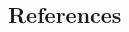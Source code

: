 \documentclass[12pt,english]{article}
\begin{document}
\begin{spacing}{1.9}
 
%
%
%
%
%

\clearpage

\section*{References}



\end{spacing}
\end{document}
